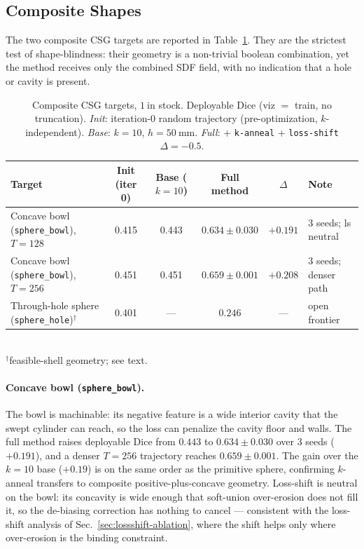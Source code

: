 \subsection{Composite Shapes}
\label{sec:composite}

The two composite CSG targets are reported in Table~\ref{tab:composite}. They are
the strictest test of shape-blindness: their geometry is a non-trivial boolean
combination, yet the method receives only the combined SDF field, with no
indication that a hole or cavity is present.

\begin{table}[t]
  \centering
  \caption{Composite CSG targets, $1~\mathrm{in}$ stock. Deployable Dice (viz $=$ train, no truncation). \emph{Init}: iteration-0 random trajectory (pre-optimization, $k$-independent). \emph{Base}: $k{=}10$, $h{=}50~\mathrm{mm}$. \emph{Full}: + \texttt{k-anneal} + \texttt{loss-shift} $\Delta{=}-0.5$.}
  \label{tab:composite}
  \small
  \begin{tabular}{lccc c l}
    \toprule
    Target & Init (iter 0) & Base ($k{=}10$) & Full method & $\Delta$ & Note \\
    \midrule
    Concave bowl (\texttt{sphere\_bowl}), $T{=}128$ & 0.415 & 0.443 & $\mathbf{0.634 \pm 0.030}$ & $+0.191$ & 3 seeds; ls neutral \\
    Concave bowl (\texttt{sphere\_bowl}), $T{=}256$ & 0.451 & 0.451 & $\mathbf{0.659 \pm 0.001}$ & $+0.208$ & 3 seeds; denser path \\
    Through-hole sphere (\texttt{sphere\_hole})$^\dagger$ & 0.401 & --- & $0.246$ & --- & open frontier \\
    \bottomrule
  \end{tabular}\\
  \small $^\dagger$feasible-shell geometry; see text.
\end{table}

\paragraph{Concave bowl (\texttt{sphere\_bowl}).}
The bowl is machinable: its negative feature is a wide interior cavity that the
swept cylinder can reach, so the loss can penalize the cavity floor and walls.
The full method raises deployable Dice from $0.443$ to $0.634 \pm 0.030$ over 3
seeds ($+0.191$), and a denser $T{=}256$ trajectory reaches $0.659 \pm 0.001$.
The gain over the $k{=}10$ base ($+0.19$) is on the same order as the primitive
sphere, confirming $k$-anneal transfers to composite positive-plus-concave
geometry. Loss-shift is neutral on the bowl: its concavity is wide enough that
soft-union over-erosion does not fill it, so the de-biasing correction has
nothing to cancel --- consistent with the loss-shift analysis of
Sec.~\ref{sec:lossshift-ablation}, where the shift helps only where over-erosion
is the binding constraint.

